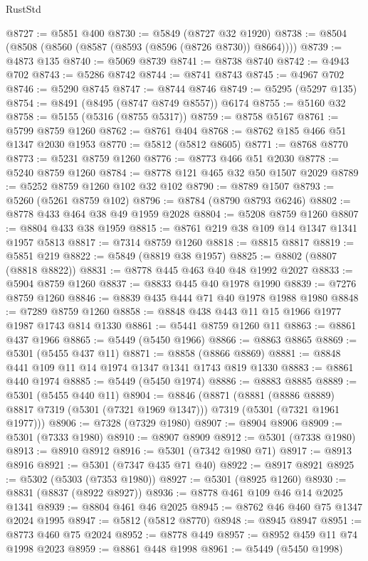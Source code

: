 \begin{lexlean}{RustStd}
\begin{coremodule}
@8727 := @5851 @400
@8730 := @5849 (@8727 @32 @1920)
@8738 := @8504 (@8508 (@8560 (@8587 (@8593 (@8596 (@8726 @8730)) @8664))))
@8739 := @4873 @135
@8740 := @5069 @8739
@8741 := @8738 @8740
@8742 := @4943 @702
@8743 := @5286 @8742
@8744 := @8741 @8743
@8745 := @4967 @702
@8746 := @5290 @8745
@8747 := @8744 @8746
@8749 := @5295 (@5297 @135)
@8754 := @8491 (@8495 (@8747 @8749 @8557)) @6174
@8755 := @5160 @32
@8758 := @5155 (@5316 (@8755 @5317))
@8759 := @8758 @5167
@8761 := @5799 @8759 @1260
@8762 := @8761 @404
@8768 := @8762 @185 @466 @51 @1347 @2030 @1953
@8770 := @5812 (@5812 @8605)
@8771 := @8768 @8770
@8773 := @5231 @8759 @1260
@8776 := @8773 @466 @51 @2030
@8778 := @5240 @8759 @1260
@8784 := @8778 @121 @465 @32 @50 @1507 @2029
@8789 := @5252 @8759 @1260 @102 @32 @102
@8790 := @8789 @1507
@8793 := @5260 (@5261 @8759 @102)
@8796 := @8784 (@8790 @8793 @6246)
@8802 := @8778 @433 @464 @38 @49 @1959 @2028
@8804 := @5208 @8759 @1260
@8807 := @8804 @433 @38 @1959
@8815 := @8761 @219 @38 @109 @14 @1347 @1341 @1957 @5813
@8817 := @7314 @8759 @1260
@8818 := @8815 @8817
@8819 := @5851 @219
@8822 := @5849 (@8819 @38 @1957)
@8825 := @8802 (@8807 (@8818 @8822))
@8831 := @8778 @445 @463 @40 @48 @1992 @2027
@8833 := @5904 @8759 @1260
@8837 := @8833 @445 @40 @1978 @1990
@8839 := @7276 @8759 @1260
@8846 := @8839 @435 @444 @71 @40 @1978 @1988 @1980
@8848 := @7289 @8759 @1260
@8858 := @8848 @438 @443 @11 @15 @1966 @1977 @1987 @1743 @814 @1330
@8861 := @5441 @8759 @1260 @11
@8863 := @8861 @437 @1966
@8865 := @5449 (@5450 @1966)
@8866 := @8863 @8865
@8869 := @5301 (@5455 @437 @11)
@8871 := @8858 (@8866 @8869)
@8881 := @8848 @441 @109 @11 @14 @1974 @1347 @1341 @1743 @819 @1330
@8883 := @8861 @440 @1974
@8885 := @5449 (@5450 @1974)
@8886 := @8883 @8885
@8889 := @5301 (@5455 @440 @11)
@8904 := @8846
    (@8871
      (@8881 (@8886 @8889) @8817 @7319 (@5301 (@7321 @1969 @1347)))
      @7319
      (@5301 (@7321 @1961 @1977)))
@8906 := @7328 (@7329 @1980)
@8907 := @8904 @8906
@8909 := @5301 (@7333 @1980)
@8910 := @8907 @8909
@8912 := @5301 (@7338 @1980)
@8913 := @8910 @8912
@8916 := @5301 (@7342 @1980 @71)
@8917 := @8913 @8916
@8921 := @5301 (@7347 @435 @71 @40)
@8922 := @8917 @8921
@8925 := @5302 (@5303 (@7353 @1980))
@8927 := @5301 (@8925 @1260)
@8930 := @8831 (@8837 (@8922 @8927))
@8936 := @8778 @461 @109 @46 @14 @2025 @1341
@8939 := @8804 @461 @46 @2025
@8945 := @8762 @46 @460 @75 @1347 @2024 @1995
@8947 := @5812 (@5812 @8770)
@8948 := @8945 @8947
@8951 := @8773 @460 @75 @2024
@8952 := @8778 @449
@8957 := @8952 @459 @11 @74 @1998 @2023
@8959 := @8861 @448 @1998
@8961 := @5449 (@5450 @1998)

\end{coremodule}
\end{lexlean}
